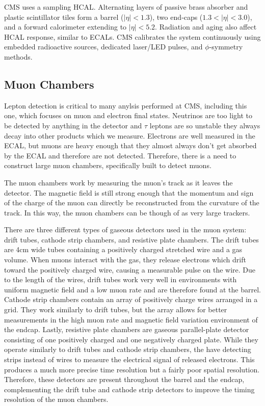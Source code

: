 CMS uses a sampling HCAL.  Alternating layers of passive brass absorber and plastic scintillator tiles form a barrel ($|\eta|<1.3$), two end‑caps ($1.3<|\eta|<3.0$), and a forward calorimeter extending to $|\eta| < 5.2$. Radiation and aging also affect HCAL response, similar to ECALs. CMS calibrates the system continuously using embedded radioactive sources, dedicated laser/LED pulses, and $\phi$‑symmetry methods.

\subsection{Muon Chambers}

Lepton detection is critical to many anylsis performed at CMS, including this one, which focuses on muon and electron final states. Neutrinos are too light to be detected by anything in the detector and $\tau$ leptons are so unstable they always decay into other products which we measure. Electrons are well measured in the ECAL, but muons are heavy enough that they almost always don't get absorbed by the ECAL and therefore are not detected. Therefore, there is a need to construct large muon chambers, specifically built to detect muons. 

The muon chambers work by measuring the muon's track as it leaves the detector. The magnetic field is still strong enough that the momentum  and sign of the charge of the muon can directly be reconstructed from the curvature of the track. In this way, the muon chambers can be though of as very large trackers. 

There are three different types of gaseous detectors used in the muon system: drift tubes, cathode strip chambers, and resistive plate chambers. The drift tubes are 4cm wide tubes containing a positively charged stretched wire and a gas volume. When muons interact with the gas, they release electrons which drift toward the positively charged wire, causing a measurable pulse on the wire. Due to the length of the wires, drift tubes work very well in environments with uniform magnetic field and a low muon rate and are therefore found at the barrel. Cathode strip chambers contain an array of positively charge wires arranged in a grid. They work similarly to drift tubes, but the array allows for better measurements in the high muon rate and magnetic field variation environment of the endcap. Lastly, resistive plate chambers are gaseous parallel-plate detector consisting of one positively charged and one negatively charged plate. While they operate similarly to drift tubes and cathode strip chambers, the have detecting strips instead of wires to measure the electrical signal of released electrons. This produces a much more precise time resolution but a fairly poor spatial resolution. Therefore, these detectors are present throughout the barrel and the endcap, complementing the drift tube and cathode strip detectors to improve the timing resolution of the muon chambers. 




